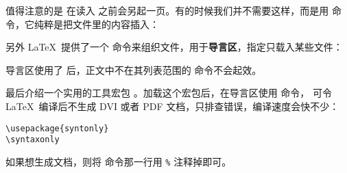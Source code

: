 值得注意的是  在读入  之前会另起一页。有的时候我们并不需要这样，而是用  命令，它纯粹是把文件里的内容插入：
\begin{command}
\end{command}

另外 \LaTeX\ 提供了一个  命令来组织文件，用于\textbf{导言区}，指定只载入某些文件：
\begin{command}
\end{command}

导言区使用了  后，正文中不在其列表范围的  命令不会起效。

最后介绍一个实用的工具宏包 。加载这个宏包后，在导言区使用  命令，
可令 \LaTeX\ 编译后不生成 DVI 或者 PDF 文档，只排查错误，编译速度会快不少：
\begin{verbatim}
\usepackage{syntonly}
\syntaxonly
\end{verbatim}

如果想生成文档，则将  命令那一行用 \texttt\% 注释掉即可。

\endinput